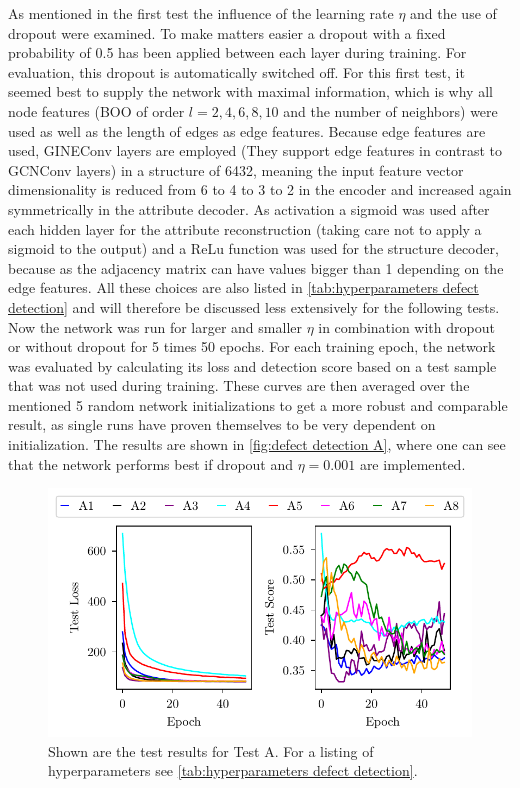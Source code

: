 \documentclass[11pt,a4paper]{article}
\begin{document}
As mentioned in the first test the influence of the learning rate $\eta$ and the use of dropout were examined. 
To make matters easier a dropout with a fixed probability of 0.5 has been applied between each layer during training. 
For evaluation, this dropout is automatically switched off. 
For this first test, it seemed best to supply the network with maximal information, which is why all node features (BOO of order $l=2,4,6,8,10$ and the number of neighbors) were used as well as the length of edges as edge features. 
Because edge features are used, GINEConv layers are employed (They support edge features in contrast to GCNConv layers) in a structure of 6432, meaning the input feature vector dimensionality is reduced from 6 to 4 to 3 to 2 in the encoder and increased again symmetrically in the attribute decoder. 
As activation a sigmoid was used after each hidden layer for the attribute reconstruction (taking care not to apply a sigmoid to the output) and a ReLu function was used for the structure decoder, because as the adjacency matrix can have values bigger than 1 depending on the edge features. 
All these choices are also listed in \autoref{tab:hyperparameters defect detection} and will therefore be discussed less extensively for the following tests. \\
Now the network was run for larger and smaller $\eta$ in combination with dropout or without dropout for 5 times 50 epochs. 
For each training epoch, the network was evaluated by calculating its loss and detection score based on a test sample that was not used during training.
These curves are then averaged over the mentioned 5 random network initializations to get a more robust and comparable result, as single runs have proven themselves to be very dependent on initialization. 
The results are shown in \autoref{fig:defect detection A}, where one can see that the network performs best if dropout and $\eta=0.001$ are implemented. 

\begin{figure}[htbp]
\centering
\includegraphics{images/plots/defect_detection_A.pdf}
\caption{Shown are the test results for Test A. For a listing of hyperparameters see \autoref{tab:hyperparameters defect detection}.}
\label{fig:defect detection A}
\end{figure}
\end{document}
